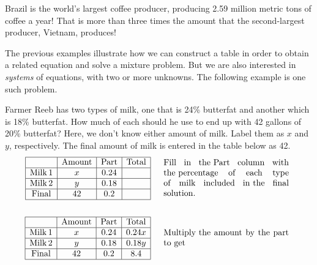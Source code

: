 {} Brazil is the world's largest coffee producer,
producing 2.59 million metric tons of coffee a year! That is more than three times
the amount that the second-largest producer, Vietnam, produces!\pp

The previous examples illustrate how we can construct a table in order to obtain
a related equation and solve a mixture problem. But we are also interested in \textit{systems} of
equations, with two or more unknowns. The following example is one such problem.

\begin{example}
  Farmer Reeb has two types of milk, one that is 24\% butterfat and another
  which is 18\% butterfat. How much of each should he use to end up with 42
  gallons of 20\% butterfat?\pp
	Here, we don't know either amount of milk.  Label them as $x$ and $y$, respectively.  The final amount of milk is entered in the table below as 42.
  \begin{eqnarray*}
    \begin{array}{|c|c|c|c|}
      \hline
      & \tmop{Amount} & \tmop{Part} & \tmop{Total}\\
      \hline
      \tmop{Milk} 1 & x & 0.24 & \\
      \hline
      \tmop{Milk} 2 & y & 0.18 & \\
      \hline
      \tmop{Final} & 42 & 0.2 & \\
      \hline
    \end{array} &  & \begin{array}{p{0.425\textwidth}}
			\tmop{Fill} \tmop{in} \tmop{the~Part}
      \tmop{column} \tmop{with} \tmop{the~percentage}
      \tmop{of} \tmop{each} \tmop{type} \tmop{of} \tmop{milk} \tmop{included}
      \tmop{in~the} \tmop{final} \tmop{solution}.
    \end{array}\\
    &  & \\
    \begin{array}{|c|c|c|c|}
      \hline
      & \tmop{Amount} & \tmop{Part} & \tmop{Total}\\
      \hline
      \tmop{Milk} 1 & x & 0.24 & 0.24 x\\
      \hline
      \tmop{Milk} 2 & y & 0.18 & 0.18 y\\
      \hline
      \tmop{Final} & 42 & 0.2 & 8.4\\
      \hline
    \end{array} &  & \begin{array}{p{0.425\textwidth}}
			\tmop{Multiply~the} \tmop{amount} \tmop{by} \tmop{the} \tmop{part} \tmop{to} \tmop{get}

\end{array}
\end{eqnarray*}
\end{example}
